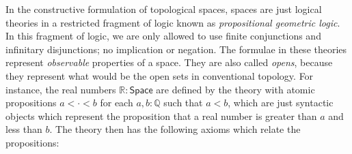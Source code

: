 \documentclass{article}           %
\newcommand{\R}{\mathbb{R}}
\newcommand{\rat}{\mathbb{Q}}
\newcommand{\Space}{\mathsf{Space}}
\begin{document}
In the constructive formulation of topological spaces, spaces are just logical theories in a restricted fragment of logic known as \emph{propositional geometric logic}. In this fragment of logic, we are only allowed to use finite conjunctions and infinitary disjunctions; no implication or negation. The formulae in these theories represent \emph{observable} properties of a space. They are also called \emph{opens}, because they represent what would be the open sets in conventional topology. For instance, the real numbers $\R : \Space$ are defined by the theory with atomic propositions $a < \cdot < b$ for each $a, b : \rat$ such that $a < b$, which are just syntactic objects which represent the proposition that a real number is greater than $a$ and less than $b$. The theory then has the following axioms which relate the propositions:
\end{document}
